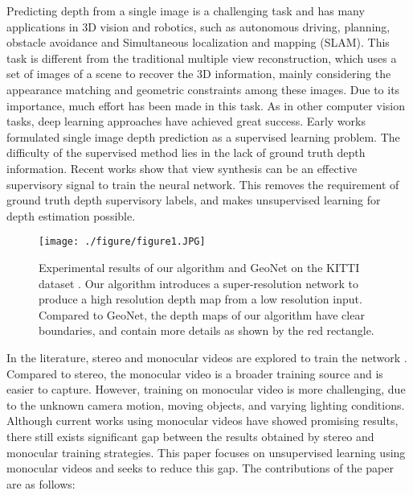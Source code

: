 \documentclass[10pt,twocolumn,letterpaper]{article}
\begin{document}
Predicting depth from a single image is a challenging task and has many applications in 3D vision and robotics, such as autonomous driving, planning, obstacle avoidance and Simultaneous localization and mapping (SLAM). This task is different from the traditional multiple view reconstruction, which uses a set of images of a scene to recover the 3D information, mainly considering the appearance matching and geometric constraints among these images. Due to its importance, much effort has been made in this task. As in other computer vision tasks, deep learning approaches have achieved great
success. Early works \cite{li2015depth,liu2015deep,wang2015towards,liu2016learning} formulated single image depth prediction as a supervised learning problem. The difficulty of the supervised method lies in the lack of ground truth depth information. Recent works \cite{godard2017unsupervised,zhou2017unsupervised,godard2017unsupervised,zou2018df,zhan2018unsupervised,wang2018learning,yang2018unsupervised,aleotti2018generative} show that view synthesis can be an effective supervisory signal to train the neural network. This removes the requirement of ground truth depth supervisory labels, and makes unsupervised learning for depth estimation possible. 
\begin{figure}
	\centering
	\texttt{[image: ./figure/figure1.JPG]}	
	\caption{Experimental results of our algorithm and GeoNet \cite{yin2018geonet} on the KITTI dataset \cite{KITTI}. Our algorithm introduces a super-resolution network to produce a high resolution depth map from a low resolution input. Compared to GeoNet, the depth maps of our algorithm have clear boundaries, and contain more details as shown by the red rectangle. }
	\label{fig:introduction}
\end{figure}

In the literature, stereo and monocular videos are explored to train the network \cite{godard2017unsupervised,zhou2017unsupervised,godard2017unsupervised,zou2018df,zhan2018unsupervised,wang2018learning,yang2018unsupervised,aleotti2018generative}. Compared to stereo, the monocular video is a broader training source and is easier to capture. However, training  on monocular video is more challenging, due to the unknown camera motion, moving objects, and varying lighting conditions. Although current works \cite{zhou2017unsupervised,wang2018learning,zou2018df,yang2018unsupervised,yang2018every}  using monocular videos have showed promising results, there still exists significant gap between the results obtained by stereo and monocular training strategies. This paper focuses on unsupervised learning using monocular videos and seeks to reduce this gap. The contributions of the paper are as follows:
\end{document}
